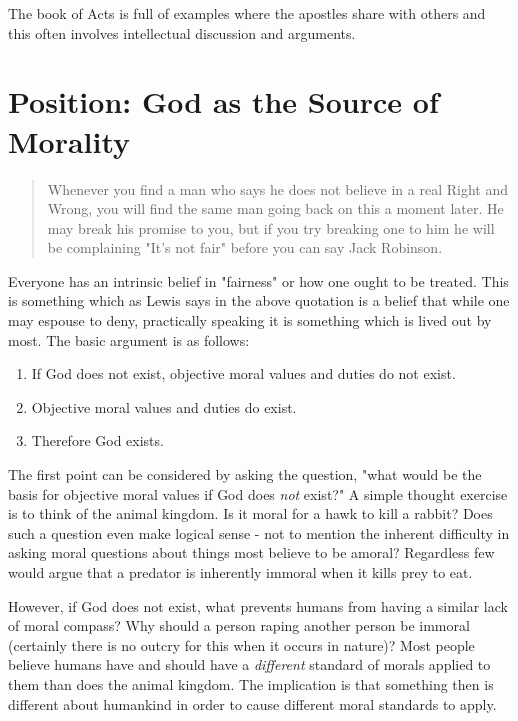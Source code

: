 \documentclass[12pt]{turabian-researchpaper}
\begin{document}
The book of Acts is full of examples where the apostles share with others and this often involves intellectual discussion and arguments. 

\section{Position: God as the Source of Morality}


\begin{quotation}
\noindent Whenever you find a man who says he does not believe in a real Right and Wrong, you will find the same man going back on this a moment later. He may break his promise to you, but if you try breaking one to him he will be complaining "It's not fair" before you can say Jack Robinson.\autocite[pg.6]{lewis2001mere}
\end{quotation}

\noindent Everyone has an intrinsic belief in "fairness" or how one ought to be treated. This is something which as Lewis says in the above quotation is a belief that while one may espouse to deny, practically speaking it is something which is lived out by most. The basic argument is as follows\autocite[pg.172]{craig2008reasonable}:

\begin{enumerate}
\item If God does not exist, objective moral values and duties do not exist.
\item Objective moral values and duties do exist.
\item Therefore God exists.
\end{enumerate}

The first point can be considered by asking the question, "what would be the basis for objective moral values if God does \textit{not} exist?" A simple thought exercise is to think of the animal kingdom. Is it moral for a hawk to kill a rabbit? Does such a question even make logical sense - not to mention the inherent difficulty in asking moral questions about things most believe to be amoral? Regardless few would argue that a predator is inherently immoral when it kills prey to eat.

However, if God does not exist, what prevents humans from having a similar lack of moral compass? Why should a person raping another person be immoral (certainly there is no outcry for this when it occurs in nature)? Most people believe humans have and should have a \textit{different} standard of morals applied to them than does the animal kingdom. The implication is that something then is different about humankind in order to cause different moral standards to apply.
\end{document}
